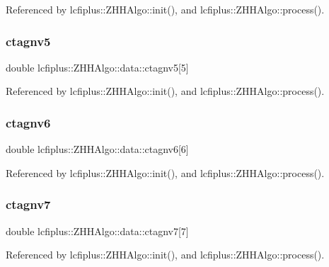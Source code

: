 Referenced by lcfiplus\+::\+Z\+H\+H\+Algo\+::init(), and lcfiplus\+::\+Z\+H\+H\+Algo\+::process().

\mbox{\label{structlcfiplus_1_1ZHHAlgo_1_1data_a13ce8f58173646c6ae80c4a54056ba15}} 
\subsubsection{ctagnv5}
{\footnotesize\ttfamily double lcfiplus\+::\+Z\+H\+H\+Algo\+::data\+::ctagnv5[5]}



Referenced by lcfiplus\+::\+Z\+H\+H\+Algo\+::init(), and lcfiplus\+::\+Z\+H\+H\+Algo\+::process().

\mbox{\label{structlcfiplus_1_1ZHHAlgo_1_1data_afe46a245a6b4afee9f4269e6d67cf1d0}} 
\subsubsection{ctagnv6}
{\footnotesize\ttfamily double lcfiplus\+::\+Z\+H\+H\+Algo\+::data\+::ctagnv6[6]}



Referenced by lcfiplus\+::\+Z\+H\+H\+Algo\+::init(), and lcfiplus\+::\+Z\+H\+H\+Algo\+::process().

\mbox{\label{structlcfiplus_1_1ZHHAlgo_1_1data_a24bb0ce3d755f8b6b1b75b8df5656efc}} 
\subsubsection{ctagnv7}
{\footnotesize\ttfamily double lcfiplus\+::\+Z\+H\+H\+Algo\+::data\+::ctagnv7[7]}



Referenced by lcfiplus\+::\+Z\+H\+H\+Algo\+::init(), and lcfiplus\+::\+Z\+H\+H\+Algo\+::process().

\mbox{\label{structlcfiplus_1_1ZHHAlgo_1_1data_a899614e298e05ccaf9d2557ff7aebe28}} 

